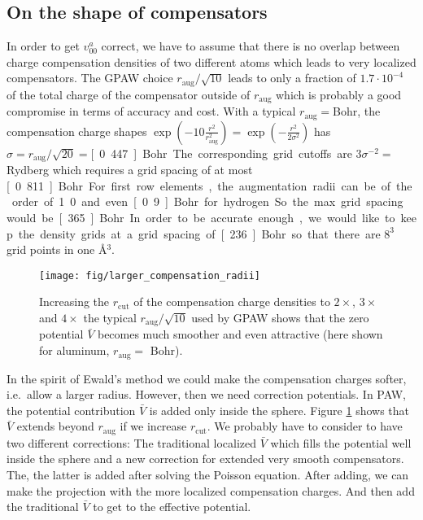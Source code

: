 \documentclass[oribibl]{llncs}
\newcommand{\um}[1]{_{\mathrm{#1}}}
\begin{document}
\subsection{On the shape of compensators} \label{sec:compensator-radii}
In order to get $v^a_{00}$ correct, we have to assume that there is no overlap
between charge compensation densities of two different atoms
which leads to very localized compensators.
The GPAW choice $r\um{aug}/\sqrt{10}$ leads to only a fraction of $1.7\cdot 10^{-4}$ of the total charge of the compensator
outside of $r\um{aug}$ which is probably a good compromise in terms of accuracy and cost.
With a typical $r\um{aug} =$\unit[2]{Bohr}, the compensation charge shapes
$\exp(-10\frac{r^2}{r\um{aug}^2}) = \exp(-\frac{r^2}{2 \sigma^2})$
has $\sigma = r\um{aug}/\sqrt{20} = $\unit[0.447]{Bohr}.
The corresponding grid cutoffs are $3\sigma^{-2} = $\unit[15]{Rydberg}
which requires a grid spacing of at most \unit[0.811]{Bohr}.
For first row elements, the augmentation radii can be 
of the order of 1.0 and even \unit[0.9]{Bohr} for hydrogen.
So the max.~grid spacing would be \unit[.365]{Bohr}.
In order to be accurate enough, we would like to
keep the density grids at a grid spacing of \unit[.236]{Bohr}
so that there are $8^3$ grid points in one \AA$^3$.


%
\begin{figure}
  \begin{minipage}[c]{.990\textwidth}
	\texttt{[image: fig/larger\_compensation\_radii]} %
  \end{minipage}\hfill
  \begin{minipage}[c]{.009\textwidth}
  \end{minipage}
  \label{fig:larger_compensation_radii}
  \caption{
	Increasing the $r\um{cut}$ of the compensation charge densities
	to $2\times$, $3\times$ and $4\times$ the typical $r\um{aug}/\sqrt{10}$
	used by GPAW shows that the zero potential $\bar V$ becomes much smoother
	and even attractive (here shown for aluminum, $r\um{aug} =$ \unit[2]{Bohr}).
  }
\end{figure}
%
%
In the spirit of Ewald's method we could make the compensation charges
softer, i.e.~allow a larger radius. However, then we need correction
potentials.
In PAW, the potential contribution $\bar V$ is added only inside the sphere.
Figure \ref{fig:larger_compensation_radii} shows that $\bar V$ extends beyond
$r\um{aug}$ if we increase $r\um{cut}$.
We probably have to consider to have two different corrections:
The traditional localized $\bar V$ which fills the potential well inside the sphere
and a new correction for extended very smooth compensators.
The, the latter is added after solving the Poisson equation.
After adding, we can make the projection with the more localized compensation charges.
And then add the traditional $\bar V$ to get to the effective potential.
\end{document}
